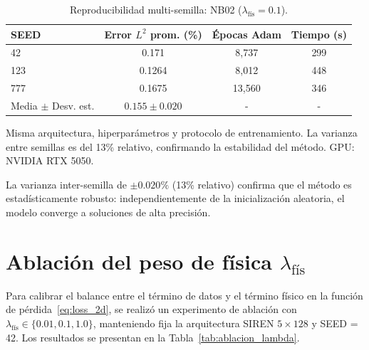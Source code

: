 \begin{table}[htbp]
\centering
\begin{threeparttable}
\caption{Reproducibilidad multi-semilla: NB02 ($\lambda_\text{fís} = 0.1$).}
\label{tab:multiseed}
\begin{tabular}{lccc}
\toprule
SEED & Error $L^2$ prom. (\%) & Épocas Adam & Tiempo (s) \\
\midrule
42   & 0.171  & 8{,}737  & 299 \\
123  & 0.1264 & 8{,}012  & 448 \\
777  & 0.1675 & 13{,}560 & 346 \\
\midrule
Media $\pm$ Desv. est. & $0.155 \pm 0.020$ & - & - \\
\bottomrule
\end{tabular}
\begin{tablenotes}\small
    \item Misma arquitectura, hiperparámetros y protocolo de entrenamiento.
    La varianza entre semillas es del 13\% relativo, confirmando la
    estabilidad del método. GPU: NVIDIA RTX 5050.
\end{tablenotes}
\end{threeparttable}
\end{table}

La varianza inter-semilla de $\pm 0.020\%$ (13\% relativo) confirma que el
método es estadísticamente robusto: independientemente de la inicialización
aleatoria, el modelo converge a soluciones de alta precisión.

\section{Ablación del peso de física $\lambda_\text{fís}$}
\label{sec:ablacion}

Para calibrar el balance entre el término de datos y el término físico en la
función de pérdida~\eqref{eq:loss_2d}, se realizó un experimento de ablación
con $\lambda_\text{fís} \in \{0.01, 0.1, 1.0\}$, manteniendo fija la
arquitectura SIREN $5 \times 128$ y SEED = 42. Los resultados se presentan en
la Tabla~\ref{tab:ablacion_lambda}.

